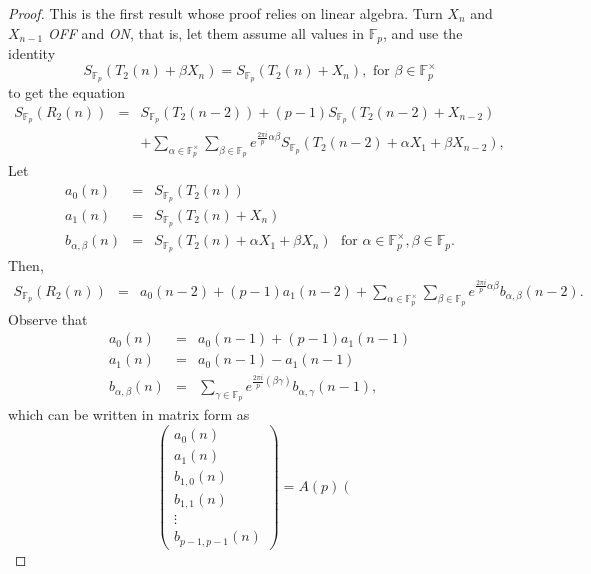 \begin{proof}
This is the first result whose proof relies on linear algebra.  Turn $X_n$ and $X_{n-1}$ {\it OFF} and {\it ON}, that is, let them assume all values in $\mathbb{F}_p$, and use the identity
\begin{equation}
 S_{\mathbb{F}_p}(T_2(n)+\beta X_n) = S_{\mathbb{F}_p}(T_2(n)+ X_n), \text{ for }\beta\in\mathbb{F}_p^{\times}
\end{equation}
to get the equation 
\begin{eqnarray}
\label{rot2}
 S_{\mathbb{F}_p}(R_2(n))&=& S_{\mathbb{F}_p}(T_2(n-2))+(p-1)S_{\mathbb{F}_p}(T_2(n-2)+X_{n-2})\\\nonumber
 &&+\sum_{\alpha\in\mathbb{F}_p^\times}\sum_{\beta \in \mathbb{F}_p}e^{\frac{2\pi i}{p}\alpha\beta}S_{\mathbb{F}_p}(T_2(n-2)+\alpha X_1+\beta X_{n-2}),
\end{eqnarray}
Let 
\begin{eqnarray}
 a_0(n)&=&S_{\mathbb{F}_p}(T_2(n))\\\nonumber
 a_1(n)&=&S_{\mathbb{F}_p}(T_2(n)+X_n)\\\nonumber
 b_{\alpha,\beta}(n)&=&S_{\mathbb{F}_p}(T_2(n)+\alpha X_1+\beta X_n)\,\, \text{ for }\alpha\in\mathbb{F}_p^\times, \beta \in \mathbb{F}_p.
\end{eqnarray}
Then,
\begin{eqnarray}
 S_{\mathbb{F}_p}(R_2(n))&=& a_0(n-2)+(p-1)a_1(n-2)+\sum_{\alpha\in\mathbb{F}_p^\times}\sum_{\beta \in \mathbb{F}_p}e^{\frac{2\pi i}{p}\alpha\beta}b_{\alpha,\beta}(n-2).
\end{eqnarray}
Observe that
\begin{eqnarray}
 a_0(n)&=& a_0(n-1)+(p-1)a_1(n-1)\\\nonumber
 a_1(n)&=& a_0(n-1)-a_1(n-1)\\\nonumber
 b_{\alpha,\beta}(n)&=& \sum_{\gamma \in \mathbb{F}_p} e^{\frac{2\pi i}{p}(\beta \gamma)} b_{\alpha,\gamma}(n-1),
\end{eqnarray}
which can be written in matrix form as
\begin{equation}
 \left(
 \begin{array}{c}
 a_0(n)\\
 a_1(n)\\
 b_{1,0}(n)\\
 b_{1,1}(n)\\
 \vdots\\
 b_{p-1,p-1}(n)
 \end{array}
 \right)=A(p)\left(
 \begin{array}{c}

\end{array}
\end{equation}
\end{proof}

